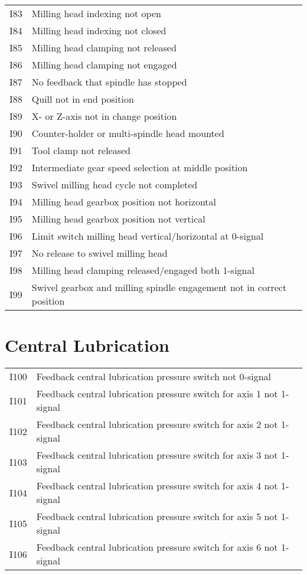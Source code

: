 \documentclass[openany,11pt]{book}
\begin{document}
\begin{table}[!h]
    \begin{tabular}{ll}
    I83 & Milling head indexing not open \\
    I84 & Milling head indexing not closed \\
    I85 & Milling head clamping not released \\
    I86 & Milling head clamping not engaged \\
    I87 & No feedback that spindle has stopped \\
    I88 & Quill not in end position \\
    I89 & X- or Z-axis not in change position \\
    I90 & Counter-holder or multi-spindle head mounted \\
    I91 & Tool clamp not released \\
    I92 & Intermediate gear speed selection at middle position \\
    I93 & Swivel milling head cycle not completed \\
    I94 & Milling head gearbox position not horizontal \\
    I95 & Milling head gearbox position not vertical \\
    I96 & Limit switch milling head vertical/horizontal at 0-signal \\
    I97 & No release to swivel milling head \\
    I98 & Milling head clamping released/engaged both 1-signal \\
    I99 & Swivel gearbox and milling spindle engagement not in correct position \\
    \end{tabular}
\end{table}

\section*{Central Lubrication}

\begin{table}[!h]
    \begin{tabular}{ll}
    I100 & Feedback central lubrication pressure switch not 0-signal \\
    I101 & Feedback central lubrication pressure switch for axis 1 not 1-signal \\
    I102 & Feedback central lubrication pressure switch for axis 2 not 1-signal \\
    I103 & Feedback central lubrication pressure switch for axis 3 not 1-signal \\
    I104 & Feedback central lubrication pressure switch for axis 4 not 1-signal \\
    I105 & Feedback central lubrication pressure switch for axis 5 not 1-signal \\
    I106 & Feedback central lubrication pressure switch for axis 6 not 1-signal \\
    \end{tabular}
\end{table}
\end{document}
